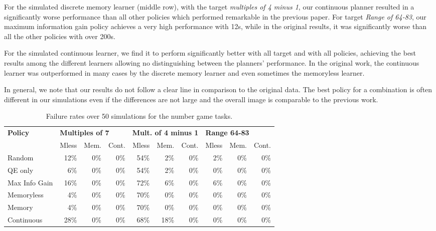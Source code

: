 For the simulated discrete memory learner (middle row), with the target \textit{multiples of 4 minus 1}, our continuous planner resulted in a significantly worse performance than all other policies which performed remarkable in the previous paper.
For target \textit{Range of 64-83}, our maximum information gain policy achieves a very high performance with 12s, while in the original results, it was significantly worse than all the other policies with over 200s.

For the simulated continuous learner, we find it to perform significantly better with all target and with all policies, achieving the best results among the different learners allowing no distinguishing between the planners' performance. 
In the original work, the continuous learner was outperformed in many cases by the discrete memory learner and even sometimes the memoryless learner.

In general, we note that our results do not follow a clear line in comparison to the original data.
The best policy for a combination is often different in our simulations even if the differences are not large and the overall image is comparable to the previous work.


\begin{table}
    \centering
    \small
    \begin{tabular}{l|rrr|rrr|rrr}
        \hline
        \textbf{Policy} & \multicolumn{3}{l|}{\textbf{Multiples of 7}}  & \multicolumn{3}{l|}{\textbf{Mult. of 4 minus 1}} &  \multicolumn{3}{l}{\textbf{Range 64-83}} \\
                        & Mless & Mem. & Cont. & Mless & Mem. & Cont. & Mless & Mem. & Cont. \\
        \hline
        Random          & 12\% & 0\% & 0\% &            54\% & 2\% & 0\% &      2\% & 0\% & 0\% \\
        QE only         & 6\% & 0\% & 0\% &            54\% & 2\% & 0\% &      0\% & 0\% & 0\% \\
        Max Info Gain & 16\% & 0\% & 0\% &             72\% & 6\% & 0\% &      6\% & 0\% & 0\% \\
        \hline
        Memoryless      & 4\% & 0\% & 0\% &            70\% & 0\% & 0\% &      0\% & 0\% & 0\% \\
        Memory          & 4\% & 0\% & 0\% &            70\% & 0\% & 0\% &      0\% & 0\% & 0\% \\
        Continuous      & 28\% & 0\% & 0\% &           68\% & 18\% & 0\% &       0\% & 0\% & 0\% \\
        \hline
    \end{tabular}
    \caption{Failure rates over 50 simulations for the number game tasks. }
    \label{tab:failures-t2}
\end{table}

